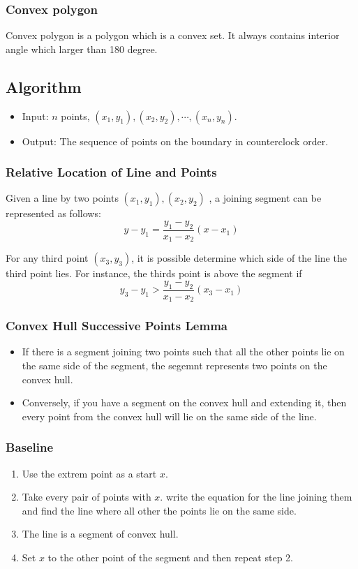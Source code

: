 \documentclass[en,hazy,blue,screen,14pt]{elegantnote}
\begin{document}
\subsubsection{Convex polygon}
Convex polygon is a polygon which is a convex set. It always contains interior 
angle which larger than 180 degree.
\subsection{Algorithm}
\begin{itemize}
 \item Input: $n$ points, $(x_1, y_1), (x_2, y_2), \cdots, (x_n, y_n)$.
 \item Output: The sequence of points on the boundary in counterclock order.
\end{itemize}

\subsubsection{Relative Location of Line and Points}
Given a line by two points $(x_1, y_1), (x_2, y_2)$ , a joining segment can 
be represented as follows:
\[y - y_1 = \frac{y_1 - y_2}{x_1 - x_2} (x - x_1)\]

For any third point $(x_3, y_3)$, it is possible determine which side of the 
line the third point lies. For instance, the thirds point is above the segment 
if 
\[y_3 - y_1 > \frac{y_1 - y_2}{x_1 - x_2} (x_3 - x_1)\]

\subsubsection{Convex Hull Successive Points Lemma}
\begin{itemize}
 \item If there is a segment joining two points such that all the other 
points lie on the same side of the segment, the segemnt represents two points 
on the convex hull.
 \item Conversely, if you have a segment on the convex hull and extending it, 
then every point from the convex hull will lie on the same side of the line.
\end{itemize}

\subsubsection{Baseline}
\begin{enumerate}
\item Use the extrem point as a start $x$.
\item Take every pair of points with $x$. write the equation for the line 
joining them and find the line where all other the points lie on the same side.
\item The line is a segment of convex hull.
\item Set $x$ to the other point of the segment and then repeat step 2.
\end{enumerate}
\end{document}
